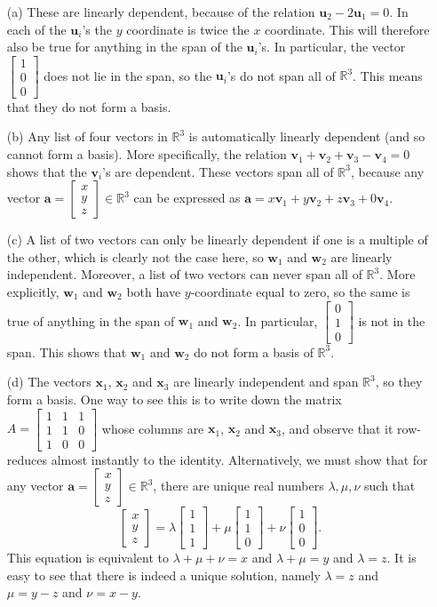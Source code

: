\documentclass{amsart}
\newcommand{\R}         {{\mathbb{R}}}
\newcommand{\bsm}       {\left[\begin{smallmatrix}}
\newcommand{\esm}       {\end{smallmatrix}\right]}
\newcommand{\lm}        {\lambda}
\newcommand{\va}        {\mathbf{a}}
\newcommand{\vu}        {\mathbf{u}}
\newcommand{\vv}        {\mathbf{v}}
\newcommand{\vw}        {\mathbf{w}}
\newcommand{\vx}        {\mathbf{x}}
\renewcommand{\:}{\colon}
\theoremstyle{definition}
\newenvironment{solution}{{\noindent \bf Solution:}}{}
\begin{document}
\begin{solution}
 \begin{itemize}
  \item[(a)] These are linearly dependent, because of the
   relation $\vu_2-2\vu_1=0$.  In each of the $\vu_i$'s the
   $y$ coordinate is twice the $x$ coordinate.  This will
   therefore also be true for anything in the span of the
   $\vu_i$'s.  In particular, the vector $\bsm 1\\0\\0\esm$
   does not lie in the span, so the $\vu_i$'s do not span
   all of $\R^3$.  This means that they do not form a basis.
  \item[(b)] Any list of four vectors in $\R^3$ is
   automatically linearly dependent (and so cannot form a
   basis).  More specifically, the relation
   $\vv_1+\vv_2+\vv_3-\vv_4=0$ shows that the $\vv_i$'s are
   dependent.  These vectors span all of $\R^3$, because any
   vector $\va=\bsm x\\ y\\ z\esm\in\R^3$ can be expressed
   as $\va=x\vv_1+y\vv_2+z\vv_3+0\vv_4$.
  \item[(c)] A list of two vectors can only be linearly
   dependent if one is a multiple of the other, which is
   clearly not the case here, so $\vw_1$ and $\vw_2$ are
   linearly independent.  Moreover, a list of two vectors
   can never span all of $\R^3$.  More explicitly, $\vw_1$
   and $\vw_2$ both have $y$-coordinate equal to zero, so
   the same is true of anything in the span of $\vw_1$ and
   $\vw_2$.  In particular, $\bsm 0\\1\\0\esm$ is not in the
   span.  This shows that $\vw_1$ and $\vw_2$ do not form a
   basis of $\R^3$.
  \item[(d)] The vectors $\vx_1$, $\vx_2$ and $\vx_3$ are
   linearly independent and span $\R^3$, so they form a
   basis.  One way to see this is to write down the matrix
   $A=\bsm 1&1&1\\1&1&0\\1&0&0\esm$ whose columns are
   $\vx_1$, $\vx_2$ and $\vx_3$, and observe that it
   row-reduces almost instantly to the identity.
   Alternatively, we must show that for any vector
   $\va=\bsm x\\ y\\ z\esm\in\R^3$, there are unique real
   numbers $\lm,\mu,\nu$ such that 
   \[ \bsm x\\ y\\ z\esm =
       \lm\bsm 1\\1\\1\esm +
       \mu\bsm 1\\1\\0\esm +
       \nu\bsm 1\\0\\0\esm.
   \] 
   This equation is equivalent to $\lm+\mu+\nu=x$ and
   $\lm+\mu=y$ and $\lm=z$.  It is easy to see that there is
   indeed a unique solution, namely $\lm=z$ and $\mu=y-z$ and
   $\nu=x-y$. 
 \end{itemize}
\end{solution}
\end{document}
